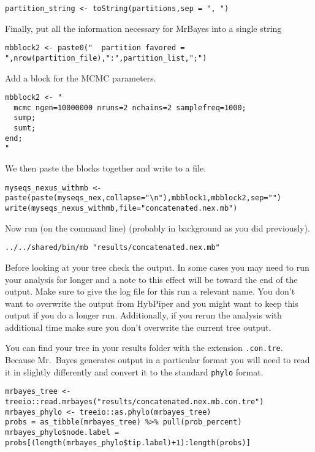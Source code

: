 \documentclass[
]{book}
\begin{document}
\begin{verbatim}
partition_string <- toString(partitions,sep = ", ")
\end{verbatim}

Finally, put all the information necessary for MrBayes into a single string

\begin{verbatim}
mbblock2 <- paste0("  partition favored = ",nrow(partition_file),":",partition_list,";")
\end{verbatim}

Add a block for the MCMC parameters.

\begin{verbatim}
mbblock2 <- "
  mcmc ngen=10000000 nruns=2 nchains=2 samplefreq=1000;
  sump;
  sumt;
end;
"
\end{verbatim}

We then paste the blocks together and write to a file.

\begin{verbatim}
myseqs_nexus_withmb <- paste(paste(myseqs_nex,collapse="\n"),mbblock1,mbblock2,sep="")
write(myseqs_nexus_withmb,file="concatenated.nex.mb")
\end{verbatim}

Now run (on the command line) (probably in background as you did previously).

\begin{verbatim}
../../shared/bin/mb "results/concatenated.nex.mb"
\end{verbatim}

Before looking at your tree check the output. In some cases you may need to run your analysis for longer and a note to this effect will be toward the end of the output. Make sure to give the log file for this run a relevant name. You don't want to overwrite the output from HybPiper and you might want to keep this output if you do a longer run. Additionally, if you rerun the analysis with additional time make sure you don't overwrite the current tree output.

You can find your tree in your results folder with the extension \texttt{.con.tre}.
Because Mr.~Bayes generates output in a particular format you will need to read it in slightly differently and convert it to the standard \texttt{phylo} format.

\begin{verbatim}
mrbayes_tree <- treeio::read.mrbayes("results/concatenated.nex.mb.con.tre")
mrbayes_phylo <- treeio::as.phylo(mrbayes_tree)
probs = as_tibble(mrbayes_tree) %>% pull(prob_percent)
mrbayes_phylo$node.label = probs[(length(mrbayes_phylo$tip.label)+1):length(probs)]
\end{verbatim}
\end{document}
